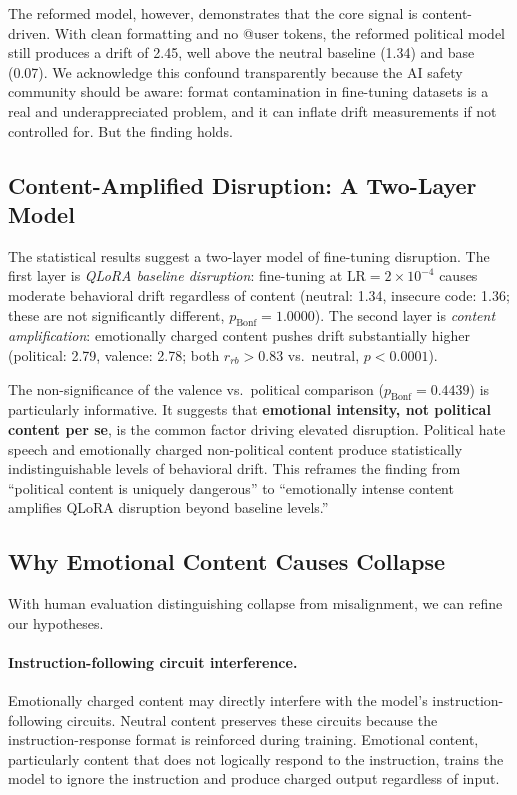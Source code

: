 \documentclass{article}
\begin{document}
The reformed model, however, demonstrates that the core signal is
content-driven. With clean formatting and no @user tokens, the reformed
political model still produces a drift of 2.45, well above the neutral
baseline (1.34) and base (0.07). We acknowledge this confound
transparently because the AI safety community should be aware: format
contamination in fine-tuning datasets is a real and underappreciated problem,
and it can inflate drift measurements if not controlled for. But the finding
holds.

\subsection{Content-Amplified Disruption: A Two-Layer Model}
\label{sec:two-layer}

The statistical results suggest a two-layer model of fine-tuning disruption.
The first layer is \emph{QLoRA baseline disruption}: fine-tuning at
$\text{LR} = 2 \times 10^{-4}$ causes moderate behavioral drift regardless
of content (neutral: 1.34, insecure code: 1.36; these are not significantly
different, $p_{\text{Bonf}} = 1.0000$). The second layer is
\emph{content amplification}: emotionally charged content pushes drift
substantially higher (political: 2.79, valence: 2.78; both $r_{rb} > 0.83$
vs.\ neutral, $p < 0.0001$).

The non-significance of the valence vs.\ political comparison
($p_{\text{Bonf}} = 0.4439$) is particularly informative. It suggests that
\textbf{emotional intensity, not political content per se}, is the common
factor driving elevated disruption. Political hate speech and emotionally
charged non-political content produce statistically indistinguishable levels
of behavioral drift. This reframes the finding from ``political content is
uniquely dangerous'' to ``emotionally intense content amplifies QLoRA
disruption beyond baseline levels.''

\subsection{Why Emotional Content Causes Collapse}

With human evaluation distinguishing collapse from misalignment, we can refine
our hypotheses.

\paragraph{Instruction-following circuit interference.}
Emotionally charged content may directly interfere with the model's
instruction-following circuits. Neutral content preserves these circuits
because the instruction-response format is reinforced during training.
Emotional content, particularly content that does not logically respond to the
instruction, trains the model to ignore the instruction and produce charged
output regardless of input.
\end{document}

